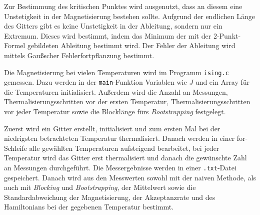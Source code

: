 	
	
	
	Zur Bestimmung des kritischen Punktes wird ausgenutzt, dass an diesem eine Unstetigkeit in der Magnetisierung bestehen sollte. Aufgrund der endlichen Länge des Gitters gibt es keine Unstetigkeit in der Ableitung, sondern nur ein Extremum. Dieses wird bestimmt, indem das Minimum der mit der 2-Punkt-Formel gebildeten Ableitung bestimmt wird. Der Fehler der Ableitung wird mittels Gaußscher Fehlerfortpflanzung bestimmt.
		
	Die Magnetisierung bei vielen Temperaturen wird im Programm \texttt{ising.c} gemessen. Dazu werden in der \texttt{main}-Funktion Variablen wie $J$ und ein Array für die Temperaturen initialisiert. Außerdem wird die Anzahl an Messungen, Thermalisierungsschritten vor der ersten Temperatur, Thermalisierungsschritten vor jeder Temperatur sowie die Blocklänge fürs \textit{Bootstrapping} festgelegt. 	
	
	Zuerst wird ein Gitter erstellt, initialisiert und zum ersten Mal bei der niedrigsten betrachteten Temperatur thermalisiert. Danach werden in einer for-Schleife alle gewählten Temperaturen aufsteigend bearbeitet, bei jeder Temperatur wird das Gitter erst thermalisiert und danach die gewünschte Zahl an Messungen durchgeführt.
	Die Messergebnisse werden in einer \texttt{.txt}-Datei gespeichert. Danach wird aus den Messwerten sowohl mit der naiven Methode, als auch mit \textit{Blocking} und \textit{Bootstrapping}, der Mittelwert sowie die Standardabweichung der Magnetisierung, der Akzeptanzrate und des Hamiltonians bei der gegebenen Temperatur bestimmt.
	
